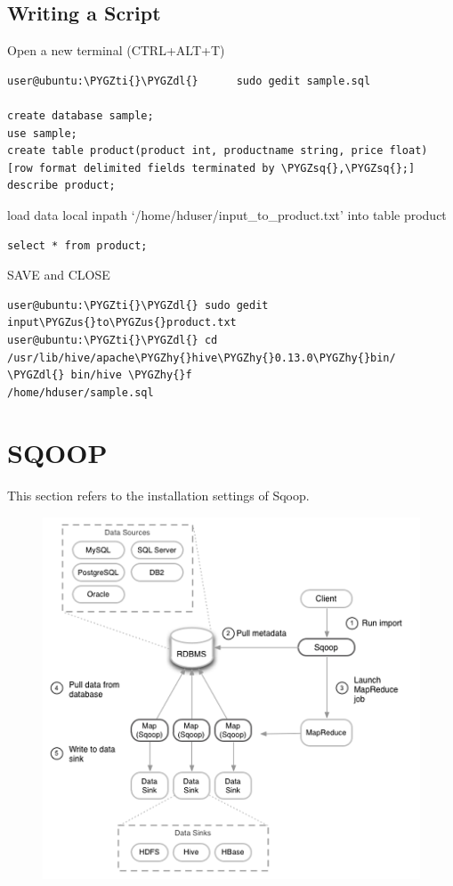 \documentclass[a4paper,12pt,oneside]{sphinxmanual}
\def\PYGZus{\char`\_}
\def\PYGZdl{\char`\$}
\def\PYGZhy{\char`\-}
\def\PYGZsq{\char`\'}
\def\PYGZti{\char`\~}
\begin{document}
\section{Writing a Script}
\label{document:writing-a-script}
Open a new terminal (CTRL+ALT+T)

\begin{Verbatim}[commandchars=\\\{\}]
user@ubuntu:\PYGZti{}\PYGZdl{}      sudo gedit sample.sql

create database sample;
use sample;
create table product(product int, productname string, price float)
[row format delimited fields terminated by \PYGZsq{},\PYGZsq{};]
describe product;
\end{Verbatim}

load data local inpath `/home/hduser/input\_to\_product.txt' into table product

\begin{Verbatim}[commandchars=\\\{\}]
select * from product;
\end{Verbatim}

SAVE and CLOSE

\begin{Verbatim}[commandchars=\\\{\}]
user@ubuntu:\PYGZti{}\PYGZdl{} sudo gedit input\PYGZus{}to\PYGZus{}product.txt
user@ubuntu:\PYGZti{}\PYGZdl{} cd /usr/lib/hive/apache\PYGZhy{}hive\PYGZhy{}0.13.0\PYGZhy{}bin/ \PYGZdl{} bin/hive \PYGZhy{}f
/home/hduser/sample.sql
\end{Verbatim}


\chapter{SQOOP}
\label{document:sqoop}
This section refers to the installation settings of Sqoop.
\begin{figure}[htbp]
\centering

\includegraphics{pik2.png}
\end{figure}
\end{document}
